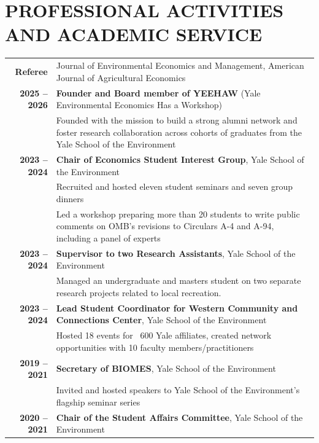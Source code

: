 \documentclass[11pt]{article}
\begin{document}
\section*{PROFESSIONAL ACTIVITIES AND ACADEMIC SERVICE}
\begin{longtable}{>{\bfseries}r p{5.5in}}%
    Referee & Journal of Environmental Economics and Management,  American Journal of Agricultural Economics \\
    2025 -- 2026 & \textbf{Founder and Board member of YEEHAW} (Yale Environmental Economics Has a Workshop) \\
    & Founded with the mission to build a strong alumni network and foster research collaboration across cohorts of graduates from the Yale School of the Environment\\
    2023 -- 2024 & \textbf{Chair of Economics Student Interest Group}, Yale School of the Environment \\
        & Recruited and hosted eleven student seminars and seven group dinners \\
        & Led a workshop preparing more than 20 students to write public comments on OMB's revisions to Circulars A-4 and A-94, including a panel of experts \\[1ex]
    2023 -- 2024 & \textbf{Supervisor to two Research Assistants}, Yale School of the Environment \\
        & Managed an undergraduate and masters student on two separate research projects related to local recreation.\\
    2023 -- 2024 & \textbf{Lead Student Coordinator for Western Community and Connections Center}, Yale School of the Environment \\
        & Hosted 18 events for ~600 Yale affiliates, created network opportunities with 10 faculty members/practitioners \\[1ex]
    2019 -- 2021 & \textbf{Secretary of BIOMES}, Yale School of the Environment \\
        & Invited and hosted speakers to Yale School of the Environment's flagship seminar series \\[1ex]
    2020 -- 2021 & \textbf{Chair of the Student Affairs Committee}, Yale School of the Environment \\

\end{longtable}
\end{document}
